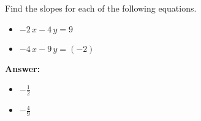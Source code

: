  Find the slopes for each of the following equations. \begin{itemize}\item \( -2 \, x - 4 \, y = 9 \)\item \( -4 \, x - 9 \, y = \left(-2\right) \)\end{itemize}

        \textbf{Answer:} \begin{itemize}\item \( -\frac{1}{2} \)\item \( -\frac{4}{9} \)\end{itemize}
